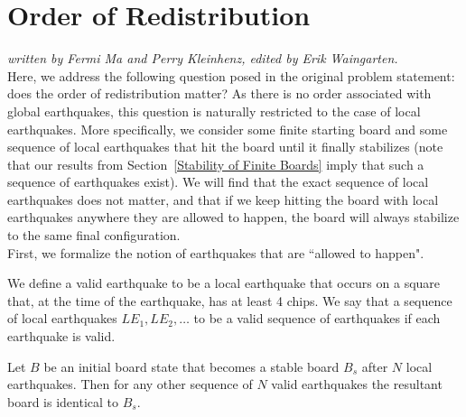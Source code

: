 \documentclass[runningheads,a4paper]{llncs}
\begin{document}
\section{Order of Redistribution}

\emph{written by Fermi Ma and Perry Kleinhenz, edited by Erik Waingarten.}\\

Here, we address the following question posed in the original problem statement: does the order of redistribution matter? As there is no order associated with global earthquakes, this question is naturally restricted to the case of local earthquakes. More specifically, we consider some finite starting board and some sequence of local earthquakes that hit the board until it finally stabilizes (note that our results from Section~\ref{Stability of Finite Boards} imply that such a sequence of earthquakes exist). We will find that the exact sequence of local earthquakes does not matter, and that if we keep hitting the board with local earthquakes anywhere they are allowed to happen, the board will always stabilize to the same final configuration.\\

First, we formalize the notion of earthquakes that are ``allowed to happen".

\begin{definition}
We define a valid earthquake to be a local earthquake that occurs on a square that, at the time of the earthquake, has at least 4 chips. We say that a sequence of local earthquakes $LE_1, LE_2, \ldots$ to be a valid sequence of earthquakes if each earthquake is valid.
\end{definition}

\begin{theorem}
Let $B$ be an initial board state that becomes a stable board $B_s$ after $N$ local earthquakes. Then for any other sequence of $N$ valid earthquakes the resultant board is identical to $B_s$.
\end{theorem}
\end{document}
